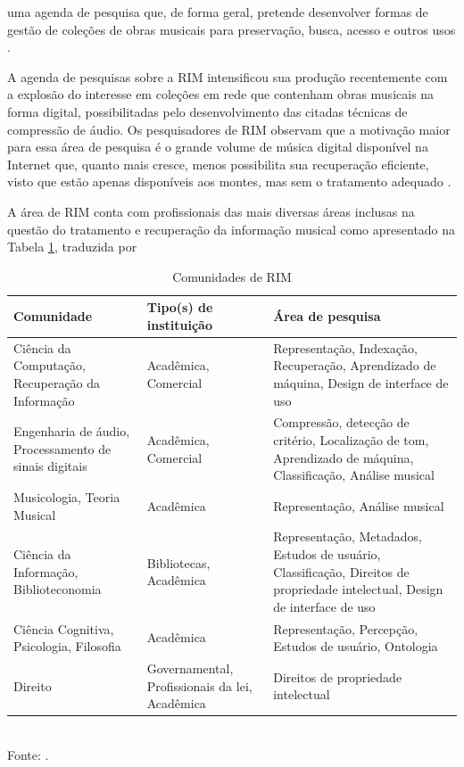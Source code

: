 \begin{citacao}
[...] uma agenda de pesquisa que, de forma geral, pretende desenvolver formas de gestão de coleções de obras musicais para preservação, busca, acesso e outros usos \cite{futrelle&downie2002}.
\end{citacao}

A agenda de pesquisas sobre a RIM intensificou sua produção recentemente com a explosão do interesse em coleções em rede que contenham obras musicais na forma digital, possibilitadas pelo desenvolvimento das citadas técnicas de compressão de áudio. Os pesquisadores de RIM observam que a motivação maior para essa área de pesquisa é o grande volume de música digital disponível na Internet que, quanto mais cresce, menos possibilita sua recuperação eficiente, visto que estão apenas disponíveis aos montes, mas sem o tratamento adequado \cite{gomes2015}.

A área de RIM conta com profissionais das mais diversas áreas inclusas na questão do tratamento e recuperação da informação musical como apresentado na Tabela \ref{tab:comunidadeRim}, traduzida por 

\begin{table}[ht]
    \centering
    \caption{Comunidades de RIM}
    \begin{tabular}{|p{4cm}|p{4cm}|p{4cm}|}
    \hline
        Comunidade & Tipo(s) de instituição & Área de pesquisa \\
    \hline
        Ciência da Computação, Recuperação da Informação & Acadêmica, Comercial & Representação, Indexação, Recuperação, Aprendizado de máquina, Design de interface de uso \\
    \hline
        Engenharia de áudio, Processamento de sinais digitais & Acadêmica, Comercial & Compressão, detecção de critério, Localização de tom, Aprendizado de máquina, Classificação, Análise musical \\
    \hline
        Musicologia, Teoria Musical & Acadêmica & Representação, Análise musical \\
    \hline
        Ciência da Informação, Biblioteconomia & Bibliotecas, Acadêmica & Representação, Metadados, Estudos de usuário, Classificação, Direitos de propriedade intelectual, Design de interface de uso \\
    \hline
        Ciência Cognitiva, Psicologia, Filosofia & Acadêmica & Representação, Percepção, Estudos de usuário, Ontologia \\
    \hline
        Direito & Governamental, Profissionais da lei, Acadêmica & Direitos de propriedade intelectual \\
    \hline
    \end{tabular}
    \label{tab:comunidadeRim}
    \\Fonte: .
\end{table}

